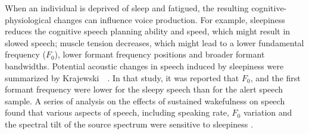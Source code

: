 When an individual is deprived of sleep and fatigued, the resulting cognitive-physiological changes can influence voice production. For example, sleepiness reduces the cognitive speech planning ability and speed, which might result in slowed speech;
muscle tension decreases, which might lead to a lower fundamental frequency ($F_0$), lower formant frequency positions and broader formant bandwidths. Potential acoustic changes in speech induced by sleepiness were summarized by Krajewski~\etal~\cite{krajewski2009acoustic}. In that study, it was reported that $F_0$, and the first formant frequency were lower for the sleepy speech than for the alert speech sample.
A series of analysis on the effects of sustained wakefulness on speech found that various aspects of speech, including speaking rate, $F_0$ variation and the spectral tilt of the source spectrum were sensitive to sleepiness \cite{Vogel2011}.

\iffalse
For example, by analyzing read sentences, Greely~\etal~\cite{Greeley2007} found that certain phones in human speech show temporal and spectral variations as a function of speaker's fatigue. 
Krajewski~\etal~\cite{krajewski2009acoustic} suggested that sleepiness may have an influence on phonation and articulation of speech which affects the voice quality and speech rate.  
This study analyzed both read and spontaneous speech. 
\Soo{Could you give more details about these studies?}
\fi

